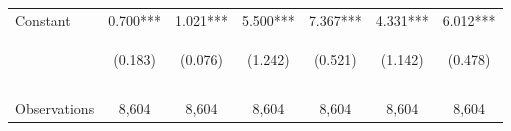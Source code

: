 \begin{center}
\begin{tabular}{lcccccc}
Constant & 0.700*** & 1.021*** & 5.500*** & 7.367*** & 4.331*** & 6.012*** \\
 & \begin{footnotesize}(0.183)\end{footnotesize} & \begin{footnotesize}(0.076)\end{footnotesize} & \begin{footnotesize}(1.242)\end{footnotesize} & \begin{footnotesize}(0.521)\end{footnotesize} & \begin{footnotesize}(1.142)\end{footnotesize} & \begin{footnotesize}(0.478)\end{footnotesize} \\
 & \begin{footnotesize}[0.000]\end{footnotesize} & \begin{footnotesize}[0.000]\end{footnotesize} & \begin{footnotesize}[0.000]\end{footnotesize} & \begin{footnotesize}[0.000]\end{footnotesize} & \begin{footnotesize}[0.000]\end{footnotesize} & \begin{footnotesize}[0.000]\end{footnotesize} \\
\vspace{4pt} & \begin{footnotesize}\end{footnotesize} & \begin{footnotesize}\end{footnotesize} & \begin{footnotesize}\end{footnotesize} & \begin{footnotesize}\end{footnotesize} & \begin{footnotesize}\end{footnotesize} & \begin{footnotesize}\end{footnotesize} \\
Observations & 8,604 & 8,604 & 8,604 & 8,604 & 8,604 & 8,604 \\

\end{tabular}
\end{center}
